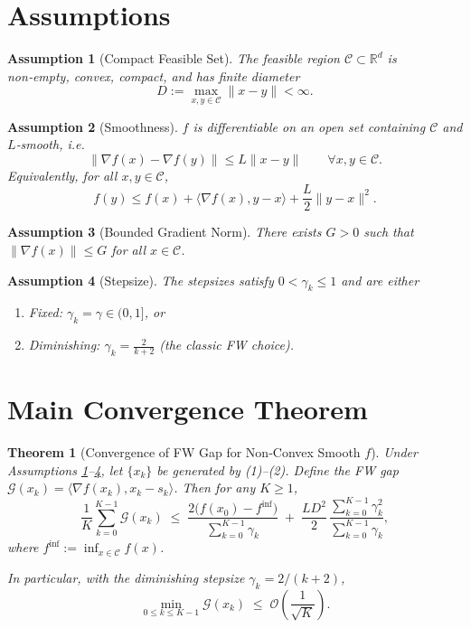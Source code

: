 \documentclass{article}
\newtheorem{theorem}{Theorem}
\newtheorem{assumption}{Assumption}
\newcommand{\grad}{\nabla}
\newcommand{\gap}{\mathcal{G}}
\newcommand{\R}{\mathbb{R}}
\newcommand{\dom}{\mathcal{C}}
\begin{document}
\section*{Assumptions}
\begin{assumption}[Compact Feasible Set]
\label{ass:compact}
The feasible region $\dom\subset\R^{d}$ is non‑empty, convex, compact, and has finite diameter
\[
D:=\max_{x,y\in\dom}\|x-y\|<\infty .
\]
\end{assumption}
\begin{assumption}[Smoothness]
\label{ass:smooth}
$f$ is differentiable on an open set containing $\dom$ and $L$‑smooth, i.e.
\[
\|\grad f(x)-\grad f(y)\|\le L\|x-y\|\qquad\forall x,y\in\dom .
\]
Equivalently, for all $x,y\in\dom$,
\[
f(y)\le f(x)+\langle\grad f(x),y-x\rangle+\frac{L}{2}\|y-x\|^{2}. \tag{3}
\]
\end{assumption}
\begin{assumption}[Bounded Gradient Norm]
\label{ass:gradbound}
There exists $G>0$ such that $\|\grad f(x)\|\le G$ for all $x\in\dom$.
\end{assumption}
\begin{assumption}[Stepsize]
\label{ass:stepsize}
The stepsizes satisfy $0<\gamma_{k}\le 1$ and are either
\begin{enumerate}[label=(\alph*)]
\item \emph{Fixed}: $\gamma_{k}= \gamma\in(0,1]$, or
\item \emph{Diminishing}: $\gamma_{k}= \frac{2}{k+2}$ (the classic FW choice).
\end{enumerate}
\end{assumption}

\section*{Main Convergence Theorem}
\begin{theorem}[Convergence of FW Gap for Non‑Convex Smooth $f$]
\label{thm:fw}
Under Assumptions \ref{ass:compact}–\ref{ass:stepsize}, let $\{x_{k}\}$ be generated by (1)–(2). Define the FW gap $\gap(x_{k})=\langle\grad f(x_{k}),x_{k}-s_{k}\rangle$. Then for any $K\ge1$,
\[
\frac{1}{K}\sum_{k=0}^{K-1}\gap(x_{k})
\;\le\;
\frac{2\bigl(f(x_{0})-f^{\inf}\bigr)}{\sum_{k=0}^{K-1}\gamma_{k}}
\;+\;
\frac{L D^{2}}{2}\,\frac{\sum_{k=0}^{K-1}\gamma_{k}^{2}}{\sum_{k=0}^{K-1}\gamma_{k}},
\tag{4}
\]
where $f^{\inf}:=\inf_{x\in\dom}f(x)$.  

In particular, with the diminishing stepsize $\gamma_{k}=2/(k+2)$,
\[
\min_{0\le k\le K-1}\gap(x_{k})\;\le\; \mathcal{O}\!\left(\frac{1}{\sqrt{K}}\right).
\]
\end{theorem}
\end{document}
